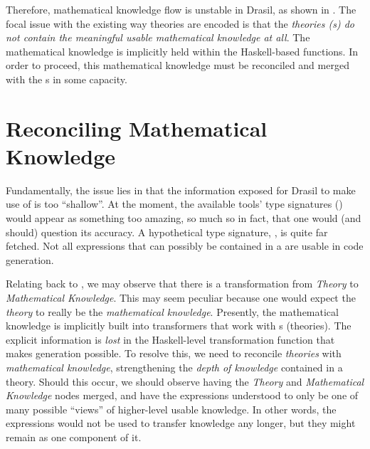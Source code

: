 Therefore, mathematical knowledge flow is unstable in Drasil, as shown in
. The focal issue with the existing way theories
are encoded is that the \textit{theories (\RelationConcept{}s) do not contain
	the meaningful usable mathematical knowledge at all}. The mathematical knowledge
is implicitly held within the Haskell-based functions. In order to proceed, this mathematical knowledge
must be reconciled and merged with the \RelationConcept{}s in some capacity.

\theoriesWithoutModelKinds{}

\section{Reconciling Mathematical Knowledge}

Fundamentally, the issue lies in that the information exposed for Drasil to make
use of is too ``shallow''. At the moment, the available tools' type signatures
() would appear as something too amazing, so much so
in fact, that one would (and should) question its accuracy. A hypothetical type
signature, , is quite far fetched. Not all
expressions that can possibly be contained in a \RelationConcept{} are usable in
code generation.

Relating back to , we may observe that there is a
transformation from \textit{Theory} to \textit{Mathematical Knowledge}. This may
seem peculiar because one would expect the \textit{theory} to really be the
\textit{mathematical knowledge}. Presently, the mathematical knowledge is
implicitly built into transformers that work with \RelationConcept{}s
(theories). The explicit information is \textit{lost} in the Haskell-level
transformation function that makes generation possible. To resolve this, we need
to reconcile \textit{theories} with \textit{mathematical knowledge},
strengthening the \textit{depth of knowledge} contained in a theory. Should this
occur, we should observe  having the
\textit{Theory} and \textit{Mathematical Knowledge} nodes merged, and have the
expressions understood to only be one of many possible ``views'' of higher-level
usable knowledge. In other words, the expressions would not be used to transfer
knowledge any longer, but they might remain as one component of it.
 



